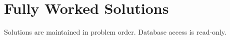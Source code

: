 \chapter{Fully Worked Solutions}
\label{ch:solutions}

Solutions are maintained in problem order. Database access is read-only.
